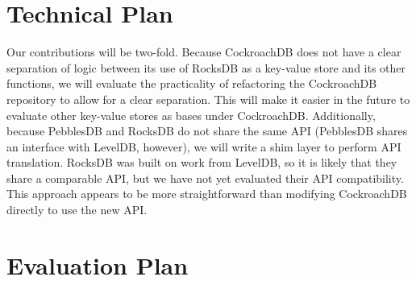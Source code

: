 \documentclass[10pt,twocolumn,letterpaper]{article}
\begin{document}
\section{Technical Plan}
Our contributions will be two-fold. Because CockroachDB does not have a clear separation of logic between its use of RocksDB as a key-value store and its other functions, we will evaluate the practicality of refactoring the CockroachDB repository to allow for a clear separation. This will make it easier in the future to evaluate other key-value stores as bases under CockroachDB. Additionally, because PebblesDB and RocksDB do not share the same API (PebblesDB shares an interface with LevelDB, however), we will write a shim layer to perform API translation. RocksDB was built on work from LevelDB, so it is likely that they share a comparable API, but we have not yet evaluated their API compatibility. This approach appears to be more straightforward than modifying CockroachDB directly to use the new API.


\section{Evaluation Plan}

\end{document}
